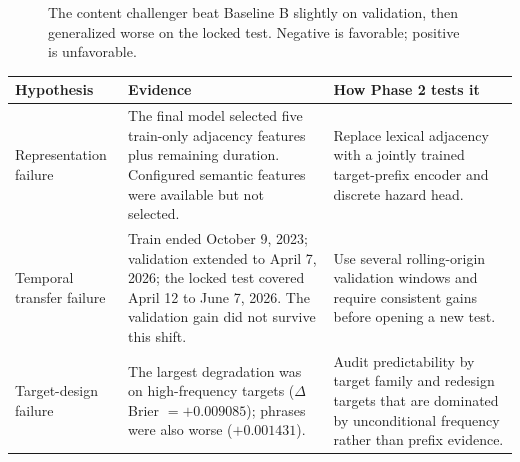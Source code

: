 \documentclass[10pt,a4paper]{article}
\begin{document}
\begin{figure}[h]
  \centering
  \caption{The content challenger beat Baseline B slightly on validation, then
  generalized worse on the locked test. Negative is favorable; positive is unfavorable.}
\end{figure}

\vspace{-2mm}
\small
\begin{tabularx}{\textwidth}{@{}L{31mm}Y L{45mm}@{}}
  \toprule
  \textbf{Hypothesis} & \textbf{Evidence} & \textbf{How Phase 2 tests it}\\
  \midrule
  Representation failure &
  The final model selected five train-only adjacency features plus remaining
  duration. Configured semantic features were available but not selected. &
  Replace lexical adjacency with a jointly trained target-prefix encoder and
  discrete hazard head.\\
  Temporal transfer failure &
  Train ended October 9, 2023; validation extended to April 7, 2026; the locked test
  covered April 12 to June 7, 2026. The validation gain did not survive this shift. &
  Use several rolling-origin validation windows and require consistent gains before
  opening a new test.\\
  Target-design failure &
  The largest degradation was on high-frequency targets
  (\(\Delta\) Brier \(=+0.009085\)); phrases were also worse
  (\(+0.001431\)). &
  Audit predictability by target family and redesign targets that are dominated by
  unconditional frequency rather than prefix evidence.\\
  \bottomrule
\end{tabularx}
\end{document}

